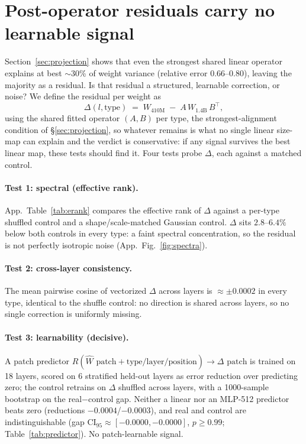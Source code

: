 \section{Post-operator residuals carry no learnable signal}
\label{sec:residuals}

Section~\ref{sec:projection} shows that even the strongest shared linear operator
explains at best $\sim$30\% of weight variance (relative error $0.66$--$0.80$),
leaving the majority as a residual. Is that residual a structured, learnable
correction, or noise? We define the residual per weight as
\begin{equation}
\Delta(l,\text{type}) \;=\; W_{410\text{M}} \;-\; A\, W_{1.4\text{B}}\, B^{\top},
\label{eq:delta}
\end{equation}
using the shared fitted operator $(A,B)$ per type, the strongest-alignment
condition of \S\ref{sec:projection}, so whatever remains is what no single linear
size-map can explain and the verdict is conservative: if any signal survives the
best linear map, these tests should find it. Four tests probe $\Delta$, each
against a matched control.

\paragraph{Test 1: spectral (effective rank).}
App.~Table~\ref{tab:erank} compares the effective rank of $\Delta$ against a
per-type shuffled control and a shape/scale-matched Gaussian control. $\Delta$
sits $2.8$--$6.4\%$ below both controls in every type: a faint spectral
concentration, so the residual is not perfectly isotropic noise
(App.~Fig.~\ref{fig:spectra}).

\paragraph{Test 2: cross-layer consistency.}
The mean pairwise cosine of vectorized $\Delta$ across layers is
$\approx\pm0.0002$ in every type, identical to the shuffle control: no direction
is shared across layers, so no single correction is uniformly missing.

\paragraph{Test 3: learnability (decisive).}
A patch predictor $R(\hat{W}\text{ patch} + \text{type/layer/position})
\to \Delta\text{ patch}$ is trained on 18 layers, scored on 6 stratified held-out
layers as error reduction over predicting zero; the control retrains on $\Delta$
shuffled across layers, with a 1000-sample bootstrap on the real$-$control gap.
Neither a linear nor an MLP-512 predictor beats zero (reductions
$-0.0004$/$-0.0003$), and real and control are indistinguishable (gap
CI$_{95}\approx[-0.0000,-0.0000]$, $p\ge0.99$; Table~\ref{tab:predictor}). No
patch-learnable signal.

